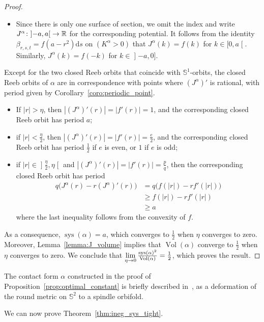 \documentclass[AHL,Unicode,longabstracts]{cedram}
\DeclareMathOperator{\vol}{Vol}
\DeclareMathOperator{\sys}{sys}
\newcommand{\bbS}{\mathbb{S}}
\newcommand{\bbR}{\mathbb{R}}
\newcommand{\rmd}{\mathrm{d}}
\renewcommand*{\to}{\mathchoice{\longrightarrow}{\rightarrow}{\rightarrow}{\rightarrow}}
\newcommand{\bbS}{\mathbb{S}}
\begin{document}
\begin{proof}
\begin{itemize}
\item Since there is only one surface of section, we omit the index and write $J^\alpha \colon\mathopen{]}-a, a\mathclose{[}\to \bbR$ for the corresponding potential. It follows from the identity $\beta_{r,s,t} = f(a-r^2)\rmd s$ on $(K^\alpha>0)$ that $J^\alpha(k) = f(k)$ for $k \in [0,a\mathclose{[}$. Similarly, $J^\alpha(k) = f(-k)$ for $k \in\mathopen{]}-a,0]$.
\end{itemize}
Except for the two closed Reeb orbits that coincide with $\bbS^1$-orbits, the closed Reeb orbits of $\alpha$ are in correspondence with points where $(J^{\alpha})'$ is rational, with period given by Corollary~\ref{coro:periodic_point}.
\begin{itemize}
\item If $|r| > \eta$, then $|(J^{\alpha})'(r)| = |f'(r)| = 1$, and the corresponding closed Reeb orbit has period $a$;
\item if $|r| < \frac{\eta}{2}$, then $|(J^{\alpha})'(r)| = |f'(r)| = \frac{e}{2}$, and the corresponding closed Reeb orbit has period $\frac{1}{2}$ if $e$ is even, or $1$ if $e$ is odd;
\item if $|r| \in\mathopen{]}\frac{\eta}{2},\eta\mathclose{[}$ and $|(J^{\alpha})'(r)| = |f'(r)| = \frac{p}{q}$, then the corresponding closed Reeb orbit has period
\begin{align*}
q\bigl(J^{\alpha}(r) - r (J^{\alpha})'(r)\bigr) &= q\bigl(f(|r|) - r f'(|r|)\bigr)\\
& \geq f(|r|) - r f'(|r|) \\
& \geq a
\end{align*}
where the last inequality follows from the convexity of $f$.
\end{itemize}
As a consequence, $\sys(\alpha)=a$, which converges to $\frac{1}{2}$ when $\eta$ converges to zero. Moreover, Lemma~\ref{lemma:J_volume} implies that $\vol(\alpha)$ converge to $\frac{1}{2}$ when $\eta$ converges to zero. We conclude that $\lim \limits_{\eta \to 0}\frac{\sys(\alpha)^2}{\vol(\alpha)} = \frac{1}{2}$, which proves the result.
\end{proof}

\begin{rema}
The contact form $\alpha$ constructed in the proof of Proposition~\ref{prop:optimal_constant} is briefly described in~\cite[Section~3]{MR4529024}, as a deformation of the round metric on $\bbS^2$ to a spindle orbifold.
\end{rema}

We can now prove Theorem~\ref{thm:ineg_sys_tight}.
\end{document}
